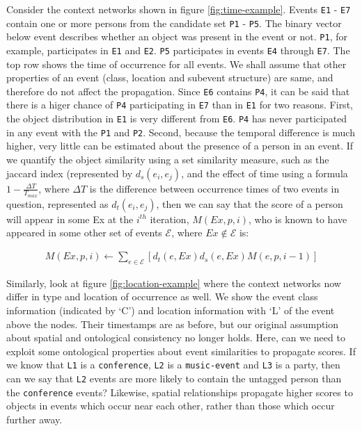 Consider the context networks shown in figure \ref{fig:time-example}. Events \texttt{E1} - \texttt{E7} contain one or more persons from the candidate set \texttt{P1} - \texttt{P5}. The binary vector below event describes whether an object was present in the event or not. \texttt{P1}, for example, participates in \texttt{E1} and \texttt{E2}. \texttt{P5} participates in events \texttt{E4} through \texttt{E7}. The top row shows the time of occurrence for all events. We shall assume that other properties of an event (class, location and subevent structure) are same, and therefore do not affect the propagation. Since \texttt{E6} contains \texttt{P4}, it can be said that there is a higer chance of \texttt{P4} participating in \texttt{E7} than in \texttt{E1} for two reasons. First, the object distribution in \texttt{E1} is very different from \texttt{E6}. \texttt{P4} has never participated in any event with the \texttt{P1} and \texttt{P2}. Second, because the temporal difference is much higher, very little can be estimated about the presence of a person in an event. If we quantify the object similarity using a set similarity measure, such as the jaccard index (represented by $d_s(e_i, e_j)$, and the effect of time using a formula $1 - \frac{\Delta T}{T_{max}}$, where $\Delta T$ is the difference between occurrence times of two events in question, represented as $d_t(e_i, e_j)$, then we can say that the score of a person will appear in some Ex at the $i^{th}$ iteration, $M(Ex, p, i)$, who is known to have appeared in some other set of events $\mathcal{E}$, where $Ex \notin \mathcal{E}$ is:

\begin{align}
\label{eq:puirank}
M(Ex, p, i) \leftarrow \sum_{e \in \mathcal{E}}[ d_t (e, Ex) d_s (e, Ex) M(e, p, i-1) ]
\end{align}

Similarly, look at figure \ref{fig:location-example} where the context networks now differ in type and location of occurrence as well. We show the event class information (indicated by `C') and location information with `L' of the event above the nodes. Their timestamps are as before, but our original assumption about spatial and ontological consistency no longer holds. Here, can we need to exploit some ontological properties about event similarities to propagate scores. If we know that \texttt{L1} is a \texttt{conference}, \texttt{L2} is a \texttt{music-event} and \texttt{L3} is a party, then can we say that \texttt{L2} events are more likely to contain the untagged person than the \texttt{conference} events? Likewise, spatial relationships propagate higher scores to objects in events which occur near each other, rather than those which occur further away.

